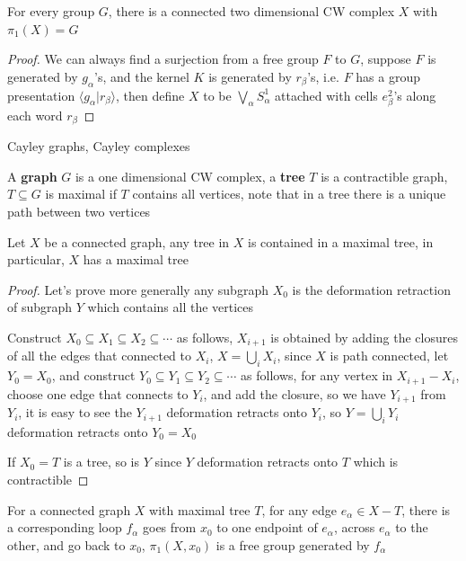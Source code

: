 \documentclass[main]{subfiles}
\begin{document}
\begin{theorem}
For every group $G$, there is a connected two dimensional CW complex $X$ with $\pi_1(X)=G$
\end{theorem}

\begin{proof}
We can always find a surjection from a free group $F$ to $G$, suppose $F$ is generated by $g_\alpha$'s, and the kernel $K$ is generated by $r_\beta$'s, i.e. $F$ has a group presentation $\langle g_\alpha|r_\beta\rangle$, then define $X$ to be $\bigvee_{\alpha}S^1_\alpha$ attached with cells $e^2_\beta$'s along each word $r_\beta$
\end{proof}

\begin{definition}
Cayley graphs, Cayley complexes
\end{definition}

\begin{definition}
A \textbf{graph} $G$ is a one dimensional CW complex, a \textbf{tree} $T$ is a contractible graph, $T\subseteq G$ is maximal if $T$ contains all vertices, note that in a tree there is a unique path between two vertices
\end{definition}

\begin{proposition}
Let $X$ be a connected graph, any tree in $X$ is contained in a maximal tree, in particular, $X$ has a maximal tree
\end{proposition}

\begin{proof}
Let's prove more generally any subgraph $X_0$ is the deformation retraction of subgraph $Y$ which contains all the vertices \par
Construct $X_0\subseteq X_1\subseteq X_2\subseteq\cdots$ as follows, $X_{i+1}$ is obtained by adding the closures of all the edges that connected to $X_i$, $X=\bigcup_{i}X_i$, since $X$ is path connected, let $Y_0=X_0$, and construct $Y_0\subseteq Y_1\subseteq Y_2\subseteq\cdots$ as follows, for any vertex in $X_{i+1}-X_i$, choose one edge that connects to $Y_i$, and add the closure, so we have $Y_{i+1}$ from $Y_i$, it is easy to see the $Y_{i+1}$ deformation retracts onto $Y_i$, so $Y=\bigcup_i Y_i$ deformation retracts onto $Y_0=X_0$ \par
If $X_0=T$ is a tree, so is $Y$ since $Y$ deformation retracts onto $T$ which is contractible
\end{proof}

\begin{proposition}\label{Free basis for connected graphs}
For a connected graph $X$ with maximal tree $T$, for any edge $e_\alpha\in X-T$, there is a corresponding loop $f_\alpha$ goes from $x_0$ to one endpoint of $e_\alpha$, across $e_\alpha$ to the other, and go back to $x_0$, $\pi_1(X,x_0)$ is a free group generated by $f_\alpha$
\end{proposition}
\end{document}
